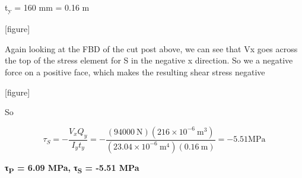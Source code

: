 \documentclass[
  letterpaper,
  DIV=11,
  numbers=noendperiod]{scrreprt}
\begin{document}
\begin{tcolorbox}
\begin{tcolorbox}
t\textsubscript{y} = 160 mm = 0.16 m

{[}figure{]}

Again looking at the FBD of the cut post above, we can see that Vx goes
across the top of the stress element for S in the negative x direction.
So we a negative force on a positive face, which makes the resulting
shear stress negative

{[}figure{]}

So

\[
\tau_S=-\frac{V_x Q_y}{I_y t_y}=-\frac{(94000 \mathrm{~N})\left(216 \times 10^{-6} \mathrm{~m}^3\right)}{\left(23.04 \times 10^{-6} \mathrm{~m}^4\right)(0.16 \mathrm{~m})}=-5.51 \mathrm{MPa}
\]

\textbf{τ\textsubscript{P} = 6.09 MPa, τ\textsubscript{S} = -5.51 MPa}

\end{tcolorbox}

\end{tcolorbox}
\end{document}
